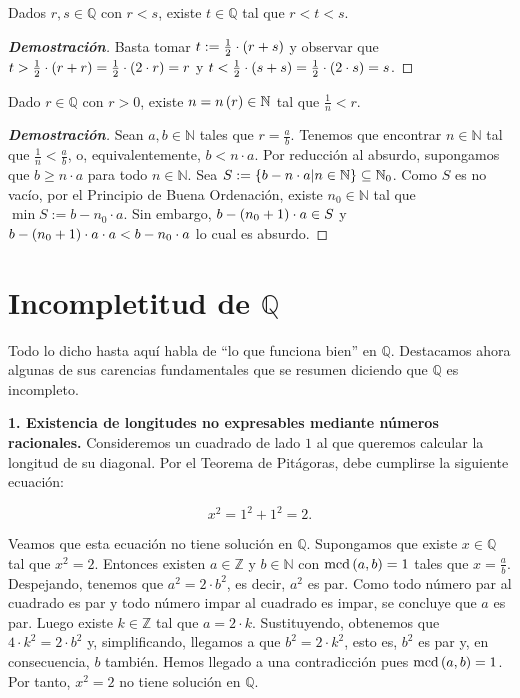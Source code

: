 \begin{proposition}
    \rm Dados $r,s\in\mathbb{Q}$ con $r<s$, existe $t\in\mathbb{Q}$ tal que $r<t<s$. 
    \begin{proof}[\rm\textbf{Demostración}]
        Basta tomar $t:=\frac{1}{2}\cdot\left(r+s\right)$ y observar que $t>\frac{1}{2}\cdot\left(r+r\right)=\frac{1}{2}\cdot\left(2\cdot r\right)=r$ y $t<\frac{1}{2}\cdot\left(s+s\right)=\frac{1}{2}\cdot\left(2\cdot s\right)=s$.
    \end{proof}
\end{proposition}

\begin{proposition}
    \rm Dado $r\in\mathbb{Q}$ con $r>0$, existe $n=n\left(r\right)\in\mathbb{N}$ tal que $\frac{1}{n}<r$.
    \begin{proof}[\rm\textbf{Demostración}]
        Sean $a,b\in\mathbb{N}$ tales que $r=\frac{a}{b}$. Tenemos que encontrar $n\in\mathbb{N}$ tal que $\frac{1}{n}<\frac{a}{b}$, o, equivalentemente, $b<n\cdot a$. Por reducción al absurdo, supongamos que $b\geq n\cdot a$ para todo $n\in\mathbb{N}$. Sea $S:=\left\{b-n\cdot a\middle|n\in\mathbb{N}\right\}\subseteq\mathbb{N}_0$. Como $S$ es no vacío, por el Principio de Buena Ordenación, existe $n_0\in\mathbb{N}$ tal que $\min S:=b-n_0\cdot a$. Sin embargo, $b-\left(n_0+1\right)\cdot a\in S$ y $b-\left(n_0+1\right)\cdot a\cdot a<b-n_0\cdot a$ lo cual es absurdo. 
    \end{proof}
\end{proposition}

\section{Incompletitud de \texorpdfstring{$\mathbb{Q}$}{Q}}

Todo lo dicho hasta aquí habla de ``lo que funciona bien'' en $\mathbb{Q}$. Destacamos ahora algunas de sus carencias fundamentales que se resumen diciendo que $\mathbb{Q}$ es incompleto.

\textbf{1. Existencia de longitudes no expresables mediante números racionales.} Consideremos un cuadrado de lado $1$ al que queremos calcular la longitud de su diagonal. Por el Teorema de Pitágoras, debe cumplirse la siguiente ecuación:

\begin{equation}
  x^2=1^2+1^2=2.
\end{equation}

Veamos que esta ecuación no tiene solución en $\mathbb{Q}$. Supongamos que existe $x\in\mathbb{Q}$ tal que $x^2=2$. Entonces existen $a\in\mathbb{Z}$ y $b\in\mathbb{N}$ con $\text{mcd}\left(a,b\right)=1$ tales que $x=\frac{a}{b}$. Despejando, tenemos que $a^2=2\cdot b^2$, es decir, $a^2$ es par. Como todo número par al cuadrado es par y todo número impar al cuadrado es impar, se concluye que $a$ es par. Luego existe $k\in\mathbb{Z}$ tal que $a=2\cdot k$. Sustituyendo, obtenemos que $4\cdot k^2=2\cdot b^2$ y, simplificando, llegamos a que $b^2=2\cdot k^2$, esto es, $b^2$ es par y, en consecuencia, $b$ también. Hemos llegado a una contradicción pues $\text{mcd}\left(a,b\right)=1$. Por tanto, $x^2=2$ no tiene solución en $\mathbb{Q}$.

